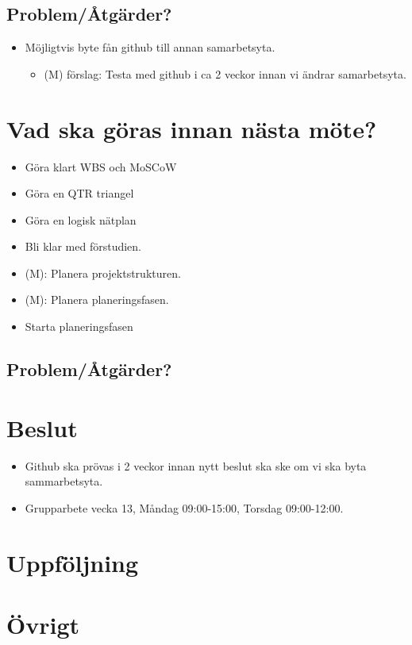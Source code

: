 \subsection*{Problem/Åtgärder?}
\begin{itemize}[noitemsep]
    \item Möjligtvis byte fån github till annan samarbetsyta.
    \begin{itemize}[noitemsep]
        \item (M) förslag: Testa med github i ca 2 veckor innan vi ändrar samarbetsyta.
    \end{itemize}
\end{itemize}

\section*{Vad ska göras innan nästa möte?}
\begin{itemize}[noitemsep]
	\item Göra klart WBS och MoSCoW
	\item Göra en QTR triangel
	\item Göra en logisk nätplan
    \item Bli klar med förstudien.
    \item (M): Planera projektstrukturen.
    \item (M): Planera planeringsfasen.
    \item Starta planeringsfasen

\end{itemize}

\subsection*{Problem/Åtgärder?}

\section*{Beslut}
\begin{itemize}
	\item Github ska prövas i 2 veckor innan nytt beslut ska ske om vi ska byta sammarbetsyta.
	\item Grupparbete vecka 13, Måndag 09:00-15:00, Torsdag 09:00-12:00.
\end{itemize}
\section*{Uppföljning}

\section*{Övrigt}